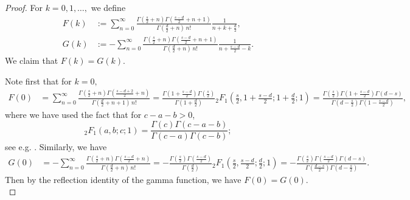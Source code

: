 \documentclass[10pt]{amsart}
\theoremstyle{plain}
\theoremstyle{remark}
\numberwithin{equation}{section}
\begin{document}
\begin{proof} 
 
For $k=0,1,\dots,$ we define 
\begin{align}
F(k)&:= \sum_{n=0}^\infty \frac{ \Gamma(\frac{s}{2}+n) \Gamma( \frac{s-d}{2}+n+1 )  }{ \Gamma(\frac{d}{2}+n) \, n! }  \frac{1}{n+k+\frac{d}{2}}, 
\\
G(k)&:= - \sum_{n=0}^\infty \frac{ \Gamma(\frac{s}{2}+n) \Gamma( \frac{s-d}{2}+n+1 )  }{ \Gamma(\frac{d}{2}+n) \, n! }  \frac{1}{ n+\frac{s-d}{2}-k }  . 
\end{align} 
We claim that $F(k)=G(k)$. 

Note first that for $k=0,$
\begin{align*}
F(0) & =  \sum_{n=0}^\infty \frac{ \Gamma(\frac{s}{2}+n) \Gamma( \frac{s-d+2}{2}+n )  }{ \Gamma(\frac{d}{2}+n+1) \, n! }
 = \frac{ \Gamma(1+\frac{s-d}{2})\Gamma(\frac{s}{2}) }{ \Gamma(1+\frac{d}{2}) } {}_2F_1(\tfrac{s}{2},1+\tfrac{s-d}{2}; 1+\tfrac{d}{2};1)
=    \frac{ \Gamma(\tfrac{s}{2})\Gamma(1+\tfrac{s-d}{2}) \Gamma(d-s) }{ \Gamma(d-\frac{s}{2})\Gamma(1-\frac{s-d}{2}) },
\end{align*}
where we have used the fact that for $c-a-b>0$, 
\begin{equation} \label{def of Gauss sum}
{}_2F_1(a,b;c;1)= \frac{ \Gamma(c)\Gamma(c-a-b) }{ \Gamma(c-a)\Gamma(c-b) }; 
\end{equation}
see e.g. \cite[Eq.(15.4.20)]{NIST}. 
Similarly, we have 
\begin{align*}
G(0) & =  -\sum_{n=0}^\infty \frac{ \Gamma(\frac{s}{2}+n) \Gamma( \frac{s-d}{2}+n )  }{ \Gamma(\frac{d}{2}+n) \, n! } 
=- \frac{ \Gamma( \frac{s}{2} )\Gamma( \frac{s-d}{2} ) }{ \Gamma(\frac{d}{2}) } {}_2F_1(\tfrac{s}{2},\tfrac{s-d}{2};\tfrac{d}{2};1)
= -  \frac{ \Gamma( \tfrac{s}{2} )    \Gamma( \tfrac{s-d}{2} )  \Gamma(d-s) }{ \Gamma(\frac{d-s}{2})\Gamma( d-\frac{s}{2} ) }.
\end{align*}
Then by the reflection identity of the gamma function, we have $F(0)=G(0).$


\end{proof}
\end{document}
